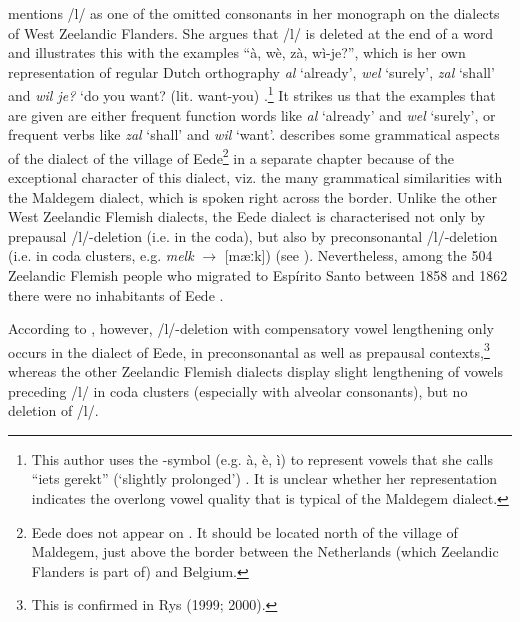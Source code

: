 \documentclass[output=paper,hidelinks,draftmode]{langscibook}
\begin{document}
  mentions /l/ as one of the omitted consonants in her monograph on the dialects of West Zeelandic Flanders. She argues that /l/ is deleted at the end of a word and illustrates this with the examples “à, wè, zà, wì-je?”, which is her own representation of regular Dutch orthography \textit{al} ‘already’, \textit{wel} ‘surely’, \textit{zal} ‘shall’ and \textit{wil je?} ‘do you want? (lit. want-you) \citep[9]{BroeckedeMan1978}.\footnote{ {This author uses the {\textasciigrave}-symbol (e.g. à, è, ì) to represent vowels that she calls “iets gerekt” (‘slightly prolonged’) \citep[9]{BroeckedeMan1978}. It is unclear whether her representation indicates the overlong vowel quality that is typical of the Maldegem dialect.}} It strikes us that the examples that are given are either frequent function words like \textit{al} ‘already’ and \textit{wel} ‘surely’, or frequent verbs like \textit{zal} ‘shall’ and \textit{wil} ‘want’. \citet[20--25]{BroeckedeMan1978} describes some grammatical aspects of the dialect of the village of Eede\footnote{Eede does not appear on . It should be located north of the village of Maldegem, just above the border between the Netherlands (which Zeelandic Flanders is part of) and Belgium.} in a separate chapter because of the exceptional character of this dialect, viz. the many grammatical similarities with the Maldegem dialect, which is spoken right across the border. Unlike the other West Zeelandic Flemish dialects, the Eede dialect is characterised not only by prepausal /l/-deletion (i.e. in the coda), but also by preconsonantal /l/-deletion (i.e. in coda clusters, e.g. \textit{melk} $\rightarrow$ [mæːk]) (see \citealt[352]{Rys1999, Rys2000}). Nevertheless, among the 504 Zeelandic Flemish people who migrated to Espírito Santo between 1858 and 1862 there were no inhabitants of Eede \citep[12]{RoosEshuis2008}.

According to \citet[163]{Taeldeman1979}, however, /l/-deletion with compensatory vowel lengthening only occurs in the dialect of Eede, in preconsonantal as well as prepausal contexts,\footnote{This is confirmed in Rys (1999; 2000).} whereas the other Zeelandic Flemish dialects display slight lengthening of vowels preceding /l/ in coda clusters (especially with alveolar consonants), but no deletion of /l/.
\end{document}
